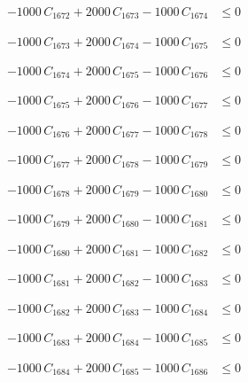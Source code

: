 \documentclass[a4paper,11pt]{article}
\begin{document}
\begin{align}
-1000\,C_{1672} + 2000\,C_{1673} - 1000\,C_{1674} &\leq 0 \nonumber
\end{align}

\begin{align}
-1000\,C_{1673} + 2000\,C_{1674} - 1000\,C_{1675} &\leq 0 \nonumber
\end{align}

\begin{align}
-1000\,C_{1674} + 2000\,C_{1675} - 1000\,C_{1676} &\leq 0 \nonumber
\end{align}

\begin{align}
-1000\,C_{1675} + 2000\,C_{1676} - 1000\,C_{1677} &\leq 0 \nonumber
\end{align}

\begin{align}
-1000\,C_{1676} + 2000\,C_{1677} - 1000\,C_{1678} &\leq 0 \nonumber
\end{align}

\begin{align}
-1000\,C_{1677} + 2000\,C_{1678} - 1000\,C_{1679} &\leq 0 \nonumber
\end{align}

\begin{align}
-1000\,C_{1678} + 2000\,C_{1679} - 1000\,C_{1680} &\leq 0 \nonumber
\end{align}

\begin{align}
-1000\,C_{1679} + 2000\,C_{1680} - 1000\,C_{1681} &\leq 0 \nonumber
\end{align}

\begin{align}
-1000\,C_{1680} + 2000\,C_{1681} - 1000\,C_{1682} &\leq 0 \nonumber
\end{align}

\begin{align}
-1000\,C_{1681} + 2000\,C_{1682} - 1000\,C_{1683} &\leq 0 \nonumber
\end{align}

\begin{align}
-1000\,C_{1682} + 2000\,C_{1683} - 1000\,C_{1684} &\leq 0 \nonumber
\end{align}

\begin{align}
-1000\,C_{1683} + 2000\,C_{1684} - 1000\,C_{1685} &\leq 0 \nonumber
\end{align}

\begin{align}
-1000\,C_{1684} + 2000\,C_{1685} - 1000\,C_{1686} &\leq 0 \nonumber
\end{align}
\end{document}
